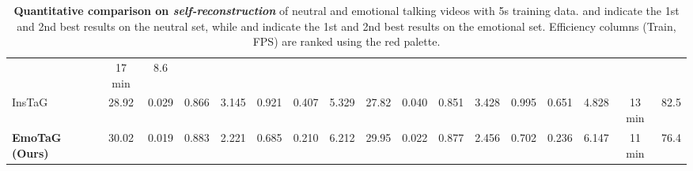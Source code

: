 \begin{table}[t]
{\begin{tabular}{l|ccccccc|ccccccc|cc}
& 17 min & 8.6 \\
InsTaG~\cite{li2025instag}
& \cellcolor{secondblue}28.92 & \cellcolor{secondblue}0.029 & \cellcolor{secondblue}0.866
& \cellcolor{secondblue}3.145 & \cellcolor{secondblue}0.921 & 0.407 & 5.329
& 27.82 & \cellcolor{secondred}0.040 & \cellcolor{secondred}0.851
& \cellcolor{secondred}3.428 & 0.995 & 0.651 & 4.828
& \cellcolor{secondred}13 min & \cellcolor{secondred}82.5 \\
\textbf{EmoTaG (Ours)}
& \cellcolor{bestblue}30.02 & \cellcolor{bestblue}0.019 & \cellcolor{bestblue}0.883
& \cellcolor{bestblue}2.221 & \cellcolor{bestblue}0.685 & \cellcolor{bestblue}0.210 & 6.212
& \cellcolor{bestred}29.95 & \cellcolor{bestred}0.022 & \cellcolor{bestred}0.877
& \cellcolor{bestred}2.456 & \cellcolor{bestred}0.702 & \cellcolor{bestred}0.236 & \cellcolor{secondred}6.147
& \cellcolor{bestred}11 min & 76.4 \\
\bottomrule
\end{tabular}}
\vspace{-5pt}
\caption{\textbf{Quantitative comparison on \textit{self-reconstruction}} of neutral and emotional talking videos with 5s training data. \protect\bestbluebox{} and \protect\secondbluebox{} indicate the 1st and 2nd best results on the neutral set, while \protect\bestredbox{} and \protect\secondredbox{} indicate the 1st and 2nd best results on the emotional set. Efficiency columns (Train, FPS) are ranked using the red palette.}
\vspace{-10pt}
\label{tab:main}
\end{table}

